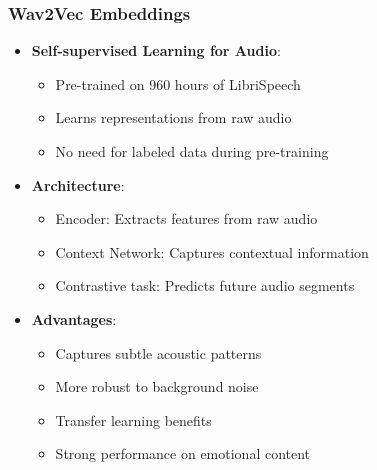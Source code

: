\documentclass{beamer}
\begin{document}
\begin{frame}
\frametitle{Wav2Vec Embeddings}
\begin{itemize}
    \item \textbf{Self-supervised Learning for Audio}:
    \begin{itemize}
        \item Pre-trained on 960 hours of LibriSpeech
        \item Learns representations from raw audio
        \item No need for labeled data during pre-training
    \end{itemize}
    \item \textbf{Architecture}:
    \begin{itemize}
        \item Encoder: Extracts features from raw audio
        \item Context Network: Captures contextual information
        \item Contrastive task: Predicts future audio segments
    \end{itemize}
    \item \textbf{Advantages}:
    \begin{itemize}
        \item Captures subtle acoustic patterns
        \item More robust to background noise
        \item Transfer learning benefits
        \item Strong performance on emotional content
    \end{itemize}
\end{itemize}
\end{frame}
\end{document}
